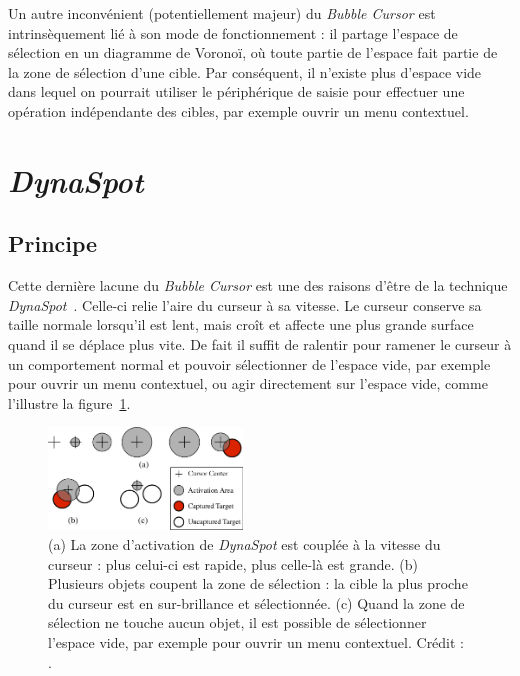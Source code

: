 	Un autre inconvénient (potentiellement majeur) du \emph{Bubble Cursor} est intrinsèquement lié à son mode de fonctionnement : il partage l'espace de sélection en un diagramme de Voronoï, où toute partie de l'espace fait partie de la zone de sélection d'une cible. Par conséquent, il n'existe plus d'espace \og vide \fg{} dans lequel on pourrait utiliser le périphérique de saisie pour effectuer une opération indépendante des cibles, par exemple ouvrir un menu contextuel.

\section{\emph{DynaSpot}}
	\subsection{Principe}
	Cette dernière lacune du \emph{Bubble Cursor} est une des raisons d'être de la technique \emph{DynaSpot}~\cite{chapuis2009dynaspot}. Celle-ci relie l'aire du curseur à sa vitesse. Le curseur conserve sa taille normale lorsqu'il est lent, mais croît et affecte une plus grande surface quand il se déplace plus vite. De fait il suffit de ralentir pour ramener le curseur à un comportement \og normal \fg{} et pouvoir sélectionner de l'espace vide, par exemple pour ouvrir un menu contextuel, ou agir directement sur l'espace vide, comme l'illustre la figure~\ref{fig:dynaSpot}.
	
	\begin{figure} %
		\centering
		\includegraphics[width=0.46\textwidth]{figures/ch2/dynaSpot}
		\caption[\emph{DynaSpot} -- principe]{(a) La zone d'activation de \emph{DynaSpot} est couplée à la vitesse du curseur : plus celui-ci est rapide, plus celle-là est grande. (b) Plusieurs objets coupent la zone de sélection : la cible la plus proche du curseur est en sur-brillance et sélectionnée. (c) Quand la zone de sélection ne touche aucun objet, il est possible de sélectionner l'espace vide, par exemple pour ouvrir un menu contextuel. Crédit : \cite{chapuis2009dynaspot}.}
		\label{fig:dynaSpot}
	\end{figure}


